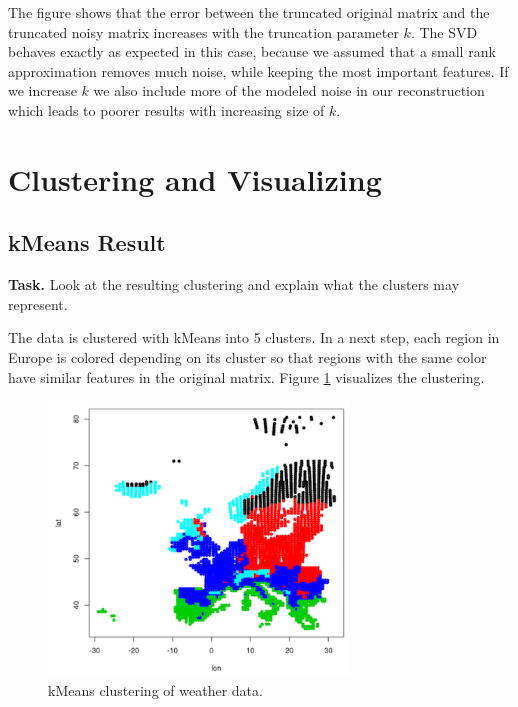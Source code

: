 \documentclass{support/acm_proc_article-sp}
\begin{document}
    The figure shows that the error between the truncated original matrix and the truncated noisy matrix increases with the
    truncation parameter $k$.
    The SVD behaves exactly as expected in this case, because we assumed that a small rank approximation removes much
    noise, while keeping the most important features.
    If we increase $k$ we also include more of the modeled noise in our reconstruction which leads to poorer results
    with increasing size of $k$.


    \section{Clustering and Visualizing}


    \subsection{kMeans Result}

    \textbf{Task.} Look at the resulting clustering and explain what the clusters may represent.

    The data is clustered with kMeans into 5 clusters.
    In a next step, each region in Europe is colored depending on its cluster so that regions with the same color have similar
    features in the original matrix.
    Figure \ref{fig:kmeans} visualizes the clustering.
    \begin{figure}[!htbp]
        \centering
        \includegraphics[width=8cm]{images/kmeans.png}
        \caption{kMeans clustering of weather data.}
        \label{fig:kmeans}
    \end{figure}
\end{document}
